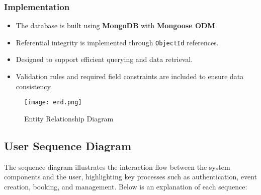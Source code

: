\subsubsection{Implementation}
\begin{itemize}
    \item The database is built using \textbf{MongoDB} with \textbf{Mongoose ODM}.
    \item Referential integrity is implemented through \texttt{ObjectId} references.
    \item Designed to support efficient querying and data retrieval.
    \item Validation rules and required field constraints are included to ensure data consistency.
\end{itemize}

\begin{figure}[H]
	\centering	\texttt{[image: erd.png]}
    \caption{Entity Relationship Diagram}
    \end{figure}





\subsection{User Sequence Diagram}

The sequence diagram illustrates the interaction flow between the system components and the user, highlighting key processes such as authentication, event creation, booking, and management. Below is an explanation of each sequence:

